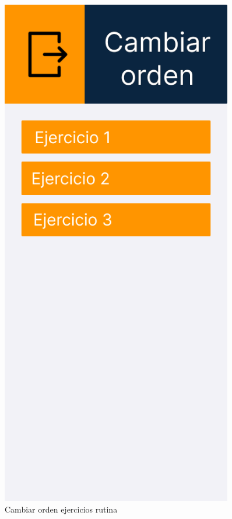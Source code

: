 \begin{figure}[H]
\begin{minipage}{0.45\textwidth}
      \label{fig:Modificar ejericios rutina}
   \end{minipage}%
   \hspace{0.5cm}
   \begin{minipage}{0.45\textwidth}
      \centering
      \includegraphics[width=0.9\textwidth]{fotos/Frame 51.png}
      \caption{Cambiar orden ejercicios rutina}
      \label{fig:Cambiar orden ejercicios rutina}
   \end{minipage}
\end{figure}

